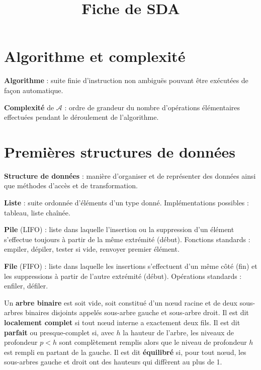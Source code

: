 \documentclass[a4paper,10pt,twocolumn]{article}
\title{\vspace{-0.8cm} \textbf{Fiche de SDA} \vspace{-1cm}}
\date{}
\begin{document}
\maketitle

\section{Algorithme et complexité}

	\begin{defn}
	\textbf{Algorithme} : suite finie d'instruction non ambiguës pouvant être exécutées de façon automatique.
	\end{defn}

	\begin{defn}
	\textbf{Complexité} de $\mathcal{A}$ : ordre de grandeur du nombre d'opérations élémentaires effectuées pendant le déroulement de l’algorithme.
	\end{defn}

\section{Premières structures de données}

	\begin{defn}
	\textbf{Structure de données} : manière d’organiser et de représenter des données ainsi que méthodes d’accès et de transformation.
	\end{defn}

	\begin{defn}
	\textbf{Liste} : suite ordonnée d’éléments d’un type donné.
	Implémentations possibles : tableau, liste chaînée.
	\end{defn}

	\begin{defn}
	\textbf{Pile} (LIFO) : liste dans laquelle l’insertion ou la suppression d’un élément s’effectue toujours à partir de la même extrémité (début).
	Fonctions standards : empiler, dépiler, tester si vide, renvoyer premier élément.
	\end{defn}

	\begin{defn}
	\textbf{File} (FIFO) : liste dans laquelle les insertions s’effectuent d’un même côté (fin) et les suppressions à partir de l’autre extrémité (début).
	Opérations standards : enfiler, défiler.
	\end{defn}

	\begin{defn}
	Un \textbf{arbre binaire} est soit vide, soit constitué d’un nœud racine et de deux sous-arbres binaires disjoints appelés sous-arbre gauche et sous-arbre droit.
	Il est dit \textbf{localement complet} si tout nœud interne a exactement deux fils.
	Il est dit \textbf{parfait} ou presque-complet si, avec $h$ la hauteur de l’arbre, les niveaux de profondeur $p < h$ sont complètement remplis alors que le niveau de profondeur $h$ est rempli en partant de la gauche.
	Il est dit \textbf{équilibré} si, pour tout nœud, les sous-arbres gauche et droit ont des hauteurs qui diffèrent au plus de 1.
	\end{defn}
\end{document}
